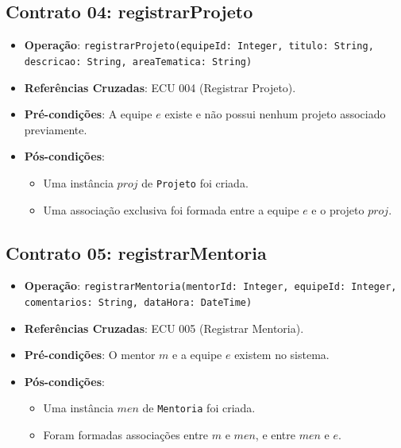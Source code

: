\documentclass[12pt]{article}
\begin{document}
\subsection{Contrato 04: registrarProjeto}
\begin{itemize}
    \item \textbf{Operação}: \texttt{registrarProjeto(equipeId: Integer, titulo: String, descricao: String, areaTematica: String)}
    \item \textbf{Referências Cruzadas}: ECU 004 (Registrar Projeto).
    \item \textbf{Pré-condições}: A equipe $e$ existe e não possui nenhum projeto associado previamente.
    \item \textbf{Pós-condições}:
    \begin{itemize}
        \item Uma instância $proj$ de \texttt{Projeto} foi criada.
        \item Uma associação exclusiva foi formada entre a equipe $e$ e o projeto $proj$.
    \end{itemize}
\end{itemize}

\subsection{Contrato 05: registrarMentoria}
\begin{itemize}
    \item \textbf{Operação}: \texttt{registrarMentoria(mentorId: Integer, equipeId: Integer, comentarios: String, dataHora: DateTime)}
    \item \textbf{Referências Cruzadas}: ECU 005 (Registrar Mentoria).
    \item \textbf{Pré-condições}: O mentor $m$ e a equipe $e$ existem no sistema.
    \item \textbf{Pós-condições}:
    \begin{itemize}
        \item Uma instância $men$ de \texttt{Mentoria} foi criada.
        \item Foram formadas associações entre $m$ e $men$, e entre $men$ e $e$.
    \end{itemize}
\end{itemize}
\end{document}
